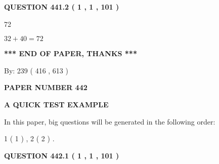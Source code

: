 \documentclass[12pt]{article}
\begin{document}
 
 
 
  
\vspace{0.2in}
  
{\textbf{\Large{QUESTION
441.2 
 ( 1 , 1 , 101 )
}}}
  
  
 
 
\noindent{}

72
 
 
 
 
\noindent{}

$ %
32 +  %
40=   %
72$
 
 
   
   
 \vspace{0.2in}
 
   
   
   
   
\vspace{1.0in} 
{\textbf{\large{ *** END OF PAPER, THANKS *** }}} 
   
   
\hspace{1.0in} By: 
 239 ( 416 ,  613 )
   
   
   
   
\newpage 
\setcounter{page}{ 
   442001 } 
   
   
   
   
 {\textbf{ \Large{ PAPER NUMBER  442  }}}
   
   
\vspace{0.2in}
   
   
   
   
   
   
 \vspace{0.2in}
{\LARGE {\textbf{ A QUICK TEST EXAMPLE}}}
   
   
   
\vspace{0.2in}
   
In this paper, big questions will be generated in the following order: 
   
   
   1 ( 1 )
 ,
   2 ( 2 )
 .
  
\vspace{0.2in}
  
{\textbf{\Large{QUESTION
442.1 
 ( 1 , 1 , 101 )
}}}
  
\end{document}

